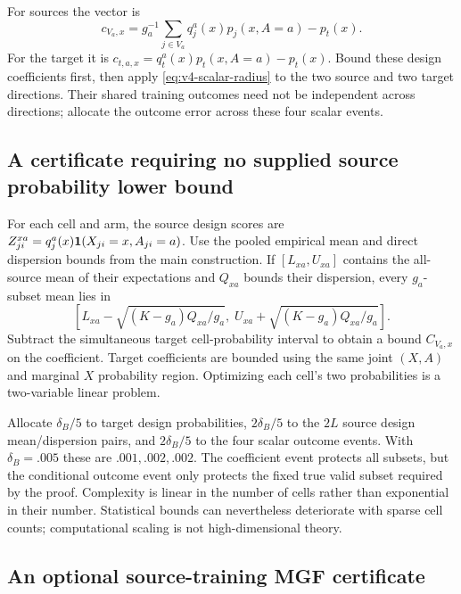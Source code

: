 For sources the vector is
\[
 c_{V_a,x}=g_a^{-1}\sum_{j\in V_a}q_j^a(x)p_j(x,A=a)-p_t(x).
\]
For the target it is $c_{t,a,x}=q_t^a(x)p_t(x,A=a)-p_t(x)$.
Bound these design coefficients first, then apply
\eqref{eq:v4-scalar-radius} to the two source and two target directions.
Their shared training outcomes need not be independent across directions;
allocate the outcome error across these four scalar events.

\subsection{A certificate requiring no supplied source probability lower bound}

For each cell and arm, the source design scores are
$Z_{ji}^{xa}=q_j^a(x)\mathbf 1(X_{ji}=x,A_{ji}=a)$.
Use the pooled empirical mean and direct dispersion bounds from the main
construction. If $[L_{xa},U_{xa}]$ contains the all-source mean of their
expectations and $Q_{xa}$ bounds their dispersion, every $g_a$-subset mean
lies in
\[
 [L_{xa}-\sqrt{(K-g_a)Q_{xa}/g_a},\;
  U_{xa}+\sqrt{(K-g_a)Q_{xa}/g_a}].
\]
Subtract the simultaneous target cell-probability interval to obtain a bound
$C_{V_a,x}$ on the coefficient. Target coefficients are bounded using the
same joint $(X,A)$ and marginal $X$ probability region. Optimizing each
cell's two probabilities is a two-variable linear problem.

Allocate $\delta_B/5$ to target design probabilities,
$2\delta_B/5$ to the $2L$ source design mean/dispersion pairs, and
$2\delta_B/5$ to the four scalar outcome events. With $\delta_B=.005$ these
are $.001,.002,.002$. The coefficient event protects all subsets, but the
conditional outcome event only protects the fixed true valid subset required
by the proof. Complexity is linear in the number of cells rather than
exponential in their number. Statistical bounds can nevertheless deteriorate
with sparse cell counts; computational scaling is not high-dimensional theory.

\subsection{An optional source-training MGF certificate}


